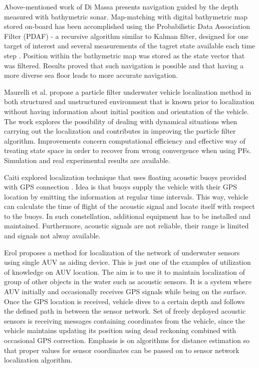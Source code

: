 Above-mentioned work of Di Massa \cite{diMassa97} presents navigation guided by the depth measured with bathymetric sonar. Map-matching with digital bathymetric map stored on-board has been accomplished using the Probabilistic Data Association Filter (PDAF) - a recursive algorithm similar to Kalman filter, designed for one target of interest and several measurements of the tagret state available each time step \cite{diMassa97}. Position within the bathymetric map was stored as the state vector that was filtered. Results proved that such navigation is possible and that having a more diverse sea floor leads to more accurate navigation.

Maurelli et al. \cite{maurelli08} propose a particle filter underwater vehicle localization method in both structured and unstructured environment that is known prior to localization without having information about initial position and orientation of the vehicle. The work explores the possibility of dealing with dynamical situations when carrying out the localization and contributes in improving the particle filter algorithm. Improvements concern computational efficiency and effective way of treating state space in order to recover from wrong convergence when using PFs. Simulation and real experimental results are available.

Caiti explored localization technique that uses floating acoustic buoys provided with GPS connection \cite{caiti05}. Idea is that buoys supply the vehicle with their GPS location by emitting the information at regular time intervals. This way, vehicle can calculate the time of flight of the acoustic signal and locate itself with respect to the buoys. In such constellation, additional equipment has to be installed and maintained. Furthermore, acoustic signals are not reliable, their range is limited and signals not alway available. 

Erol \cite{erol07} proposes a method for localization of the network of underwater sensors using single AUV as aiding device. This is just one of the examples of utilization of knowledge on AUV location. The aim is to use it to maintain localization of group of other objects in the water such as acoustic sensors. It is a system where AUV initially and occasionally receives GPS signals while being on the surface. Once the GPS location is received, vehicle dives to a certain depth and follows the defined path in between the sensor network. Set of freely deployed acoustic sensors is receiving messages containing coordinates from the vehicle, since the vehicle maintains updating its position using dead reckoning combined with occasional GPS correction. Emphasis is on algorithms for distance estimation so that proper values for sensor coordinates can be passed on to sensor network localization algorithm.

